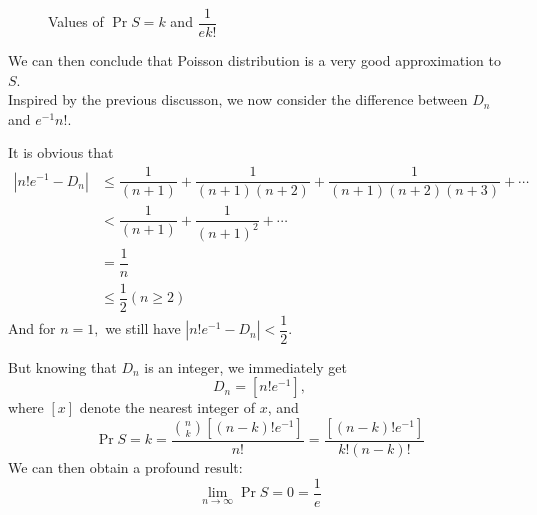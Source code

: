 \begin{figure}[H]
{  }
  \caption{Values of $ \Pr{S=k}$ and $ \dfrac{1}{ek!}$\label{fig:diff}}
\end{figure}

We can then conclude that Poisson distribution is a very good approximation to $ S$.
\\

Inspired by the previous discusson, we now consider the difference between $ D_n $ and $ e^{-1}n!$.

It is obvious that
\begin{align*}
|n! e^{-1} - D_n| & \le \dfrac{1}{(n+1)}+\dfrac{1}{(n+1)(n+2)}+ \dfrac{1}{(n+1)(n+2)(n+3)}+\cdots \\
&< \dfrac{1}{(n+1)} + \dfrac{1}{(n+1)^2 }+ \cdots  \\
& =\dfrac{1}{n}\\
& \le \dfrac{1}{2} ( n \ge 2)
\end{align*}
And for $ n=1,$ we still have $ |n!e^{-1}-D_n| < \dfrac{1}{2}.$

But knowing that $ D_n$ is an integer, we immediately get
\[  D_n = [ n!e^{-1}],\] where $ [x]$ denote the nearest integer of $ x$, and
\[ \Pr{S=k} = \dfrac{{n\choose{k}}[(n-k)!e^{-1}]}{n!}= \dfrac{[(n-k)!e^{-1}]}{k!(n-k)!}\]
We can then obtain a profound result:
\[ \lim\limits_{n\to\infty}\Pr{S=0} = \dfrac{1}{e}\]

